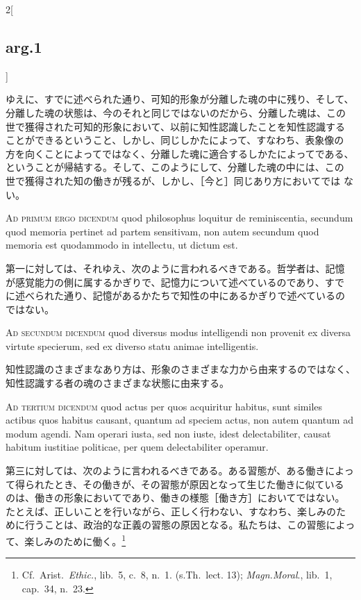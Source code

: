 \documentclass[paper=a4paper,fontsize=10pt,jafontsize=9pt,titlepage]{jlreq}
\begin{document}
\begin{paracol}{2}[\subsection{arg.1}]
\switchcolumn

ゆえに、すでに述べられた通り、可知的形象が分離した魂の中に残り、そして、
分離した魂の状態は、今のそれと同じではないのだから、分離した魂は、この
世で獲得された可知的形象において、以前に知性認識したことを知性認識する
ことができるということ、しかし、同じしかたによって、すなわち、表象像の
方を向くことによってではなく、分離した魂に適合するしかたによってである、
ということが帰結する。そして、このようにして、分離した魂の中には、この
世で獲得された知の働きが残るが、しかし、［今と］同じあり方においてでは
ない。

\switchcolumn*[\subsection{ad.1}]

{\scshape Ad primum ergo dicendum} quod philosophus loquitur de
reminiscentia, secundum quod memoria pertinet ad partem sensitivam,
non autem secundum quod memoria est quodammodo in intellectu, ut
dictum est.

\switchcolumn

第一に対しては、それゆえ、次のように言われるべきである。哲学者は、記憶
が感覚能力の側に属するかぎりで、記憶力について述べているのであり、すで
に述べられた通り、記憶があるかたちで知性の中にあるかぎりで述べているの
ではない。

\switchcolumn*[\subsection{ad.2}]

{\scshape Ad secundum dicendum} quod diversus modus intelligendi non
provenit ex diversa virtute specierum, sed ex diverso statu animae
intelligentis.

\switchcolumn

知性認識のさまざまなあり方は、形象のさまざまな力から由来するのではなく、
知性認識する者の魂のさまざまな状態に由来する。

\switchcolumn*[\subsection{ad.3}]

{\scshape Ad tertium dicendum} quod actus per quos acquiritur habitus, sunt
similes actibus quos habitus causant, quantum ad speciem actus, non
autem quantum ad modum agendi. Nam operari iusta, sed non iuste, idest
delectabiliter, causat habitum iustitiae politicae, per quem
delectabiliter operamur.

\switchcolumn

第三に対しては、次のように言われるべきである。ある習態が、ある働きによっ
て得られたとき、その働きが、その習態が原因となって生じた働きに似ている
のは、働きの形象においてであり、働きの様態［働き方］においてではない。
たとえば、正しいことを行いながら、正しく行わない、すなわち、楽しみのた
めに行うことは、政治的な正義の習態の原因となる。私たちは、この習態によっ
て、楽しみのために働く。\footnote{Cf.~Arist.~{\itshape Ethic.}, lib.~5,
c.~8, n.~1. (s.Th.~lect. 13); {\itshape Magn.Moral}., lib.~1, cap.~34,
n.~23.}

\end{paracol}
\end{document}
